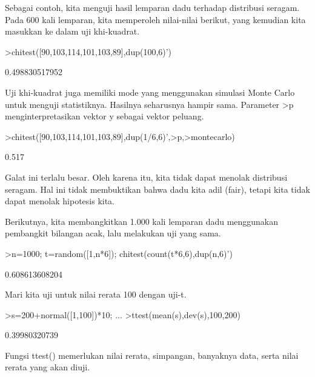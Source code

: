 \documentclass{article}
\newenvironment{eulernotebook}{\par}{\par}
\newenvironment{eulercomment}{\par\medskip}{\par\medskip}
\begin{document}
\begin{eulernotebook}
\begin{eulercomment}
Sebagai contoh, kita menguji hasil lemparan dadu terhadap distribusi
seragam. Pada 600 kali lemparan, kita memperoleh nilai-nilai berikut,
yang kemudian kita masukkan ke dalam uji khi-kuadrat.
\end{eulercomment}
\begin{eulerprompt}
>chitest([90,103,114,101,103,89],dup(100,6)')
\end{eulerprompt}
\begin{euleroutput}
  0.498830517952
\end{euleroutput}
\begin{eulercomment}
Uji khi-kuadrat juga memiliki mode yang menggunakan simulasi Monte
Carlo untuk menguji statistiknya. Hasilnya seharusnya hampir sama.
Parameter \textgreater{}p menginterpretasikan vektor y sebagai vektor peluang.
\end{eulercomment}
\begin{eulerprompt}
>chitest([90,103,114,101,103,89],dup(1/6,6)',>p,>montecarlo)
\end{eulerprompt}
\begin{euleroutput}
  0.517
\end{euleroutput}
\begin{eulercomment}
Galat ini terlalu besar. Oleh karena itu, kita tidak dapat menolak
distribusi seragam. Hal ini tidak membuktikan bahwa dadu kita adil
(fair), tetapi kita tidak dapat menolak hipotesis kita.

Berikutnya, kita membangkitkan 1.000 kali lemparan dadu menggunakan
pembangkit bilangan acak, lalu melakukan uji yang sama.
\end{eulercomment}
\begin{eulerprompt}
>n=1000; t=random([1,n*6]); chitest(count(t*6,6),dup(n,6)')
\end{eulerprompt}
\begin{euleroutput}
  0.608613608204
\end{euleroutput}
\begin{eulercomment}
Mari kita uji untuk nilai rerata 100 dengan uji-t.
\end{eulercomment}
\begin{eulerprompt}
>s=200+normal([1,100])*10; ...
>ttest(mean(s),dev(s),100,200)
\end{eulerprompt}
\begin{euleroutput}
  0.39980320739
\end{euleroutput}
\begin{eulercomment}
Fungsi ttest() memerlukan nilai rerata, simpangan, banyaknya data,
serta nilai rerata yang akan diuji.


\end{eulercomment}
\end{eulernotebook}
\end{document}
